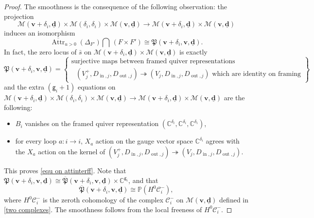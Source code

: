 \documentclass[10pt]{amsart}
\theoremstyle{definition}
\numberwithin{equation}{section}
\newcommand{\bC}{\mathbb{C}}
\newcommand{\bP}{\mathbb{P}}
\newcommand{\bv}{\mathbf{v}}
\newcommand{\bd}{\mathbf{d}}
\newcommand{\cM}{\mathcal{M}}
\newcommand{\Attr}{\operatorname{Attr}}
\newcommand{\In}{\operatorname{in}}
\newcommand{\Out}{\operatorname{out}}
\begin{document}
\begin{proof}
The smoothness is the consequence of the following observation: the projection $$\cM(\bv+\delta_i,\underline{\bd})\times \cM(\delta_i,\delta_i)\times \cM(\bv,\underline{\bd})\to \cM(\bv+\delta_i,\underline{\bd})\times \cM(\bv,\underline{\bd})$$ induces an isomorphism \begin{equation}\label{equ on attinterff}\overline{\Attr}_{u>0}(\Delta_{F'})\bigcap\,(F\times F')\cong{\mathfrak{P}}(\bv+\delta_i,\bv,\underline{\bd}).\end{equation} In fact, the zero locus of $\bar s$ on $\cM(\bv+\delta_i,\underline{\bd})\times \cM(\bv,\underline{\bd})$ is exactly $${\mathfrak{P}}(\bv+\delta_i,\bv,\underline{\bd})=\left\{\substack{\text{surjective maps between framed quiver representations }\\\text{ $(V_j^+,D_{\In ,j},D_{\Out,j})\twoheadrightarrow (V_j,D_{\In ,j},D_{\Out,j})$ which are identity on framing}}\right\},$$
and the extra $(\mathsf g_i+1)$ equations on $\cM(\bv+\delta_i,\underline{\bd})\times \cM(\delta_i,\delta_i)\times \cM(\bv,\underline{\bd})\to \cM(\bv+\delta_i,\underline{\bd})\times \cM(\bv,\underline{\bd})$ are the following:
\begin{itemize}
    \item $B_i$ vanishes on the framed quiver representation $(\bC^{\delta_i},\bC^{\delta_i},\bC^{\delta_i})$,
    \item for every loop $a:i\to i$, $X_a$ action on the gauge vector space $\bC^{\delta_i}$ agrees with the $X_a$ action on the kernel of $(V_j^+,D_{\In ,j},D_{\Out,j})\twoheadrightarrow (V_j,D_{\In ,j},D_{\Out,j})$.
\end{itemize}
This proves \eqref{equ on attinterff}. Note that ${\mathfrak{P}}(\bv+\delta_i,\bv,\underline{\bd})\cong \overline{\mathfrak{P}}(\bv+\delta_i,\bv,\underline{\bd})\times \bC^{\mathsf g_i}$, and that $$\overline{\mathfrak{P}}(\bv+\delta_i,\bv,\underline{\bd})\cong \bP(H^0\mathcal C^-_i),$$
where $H^0\mathcal C^-_i$ is the zeroth cohomology of the complex $\mathcal C^-_i$ on $\cM(\bv,\underline{\bd})$ defined in \eqref{two complexes}. The smoothness 
follows from the local freeness of $H^0\mathcal C^-_i$.
\end{proof}
\end{document}
